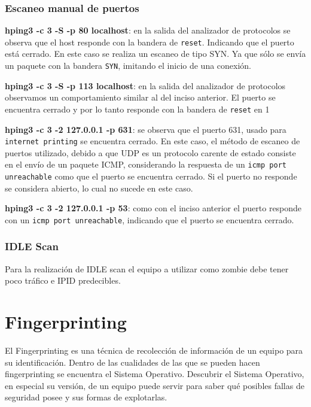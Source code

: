 \subsubsection*{Escaneo manual de puertos}

\textbf{hping3 -c 3 -S -p 80 localhost}: en la salida del analizador de protocolos se observa que el host responde con la bandera de \texttt{reset}. Indicando que el puerto está cerrado. En este caso se realiza un escaneo de tipo SYN. Ya que sólo se envía un paquete con la bandera \texttt{SYN}, imitando el inicio de una conexión.


\textbf{hping3 -c 3 -S -p 113 localhost}: en la salida del analizador de protocolos observamos un comportamiento similar al del inciso anterior. El puerto se encuentra cerrado y por lo tanto responde con la bandera de \texttt{reset} en 1


\textbf{hping3 -c 3 -2 127.0.0.1 -p 631}: se observa que el puerto 631, usado para \texttt{internet printing} se encuentra cerrado. En este caso, el método de escaneo de puertos utilizado, debido a que UDP es un protocolo carente de estado consiste en el envío de un paquete ICMP, considerando la respuesta de un \texttt{icmp port unreachable} como que el puerto se encuentra cerrado. Si el puerto no responde se considera abierto, lo cual no sucede en este caso.

\textbf{hping3 -c 3 -2 127.0.0.1 -p 53}: como con el inciso anterior el puerto responde con un \texttt{icmp port unreachable}, indicando que el puerto se encuentra cerrado.


\subsubsection*{IDLE Scan}

Para la realización de IDLE scan el equipo a utilizar como zombie debe tener poco tráfico e IPID predecibles.

\section*{Fingerprinting}

El Fingerprinting es una técnica de recolección de información de un equipo para su identificación. Dentro de las cualidades de las que se pueden hacen fingerprinting se encuentra el Sistema Operativo. Descubrir el Sistema Operativo, en especial su versión, de un equipo puede servir para saber qué posibles fallas de seguridad posee y sus formas de explotarlas.


